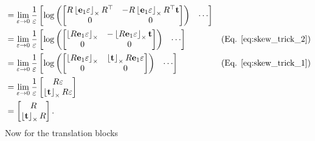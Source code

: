 \begin{align*}
 & =\lim_{\varepsilon\to0}\frac{1}{\varepsilon}\begin{bmatrix}\log\left(\begin{bmatrix}R\left\lfloor\mathbf{e}_{1}\varepsilon\right\rfloor_{\times}R^{\top} & -R\left\lfloor\mathbf{e}_{1}\varepsilon\right\rfloor_{\times}R^{\top}\mathbf{t}\\
0 & 0
\end{bmatrix}\right) & \cdots\end{bmatrix}\\
 & =\lim_{\varepsilon\to0}\frac{1}{\varepsilon}\begin{bmatrix}\log\left(\begin{bmatrix}\left\lfloor R\mathbf{e}_{1}\varepsilon\right\rfloor_{\times} & -\left\lfloor R\mathbf{e}_{1}\varepsilon\right\rfloor_{\times}\mathbf{t}\\
0 & 0
\end{bmatrix}\right) & \cdots\end{bmatrix} & \textnormal{(Eq. \ref{eq:skew_trick_2})}\\
 & =\lim_{\varepsilon\to0}\frac{1}{\varepsilon}\begin{bmatrix}\log\left(\begin{bmatrix}\left\lfloor R\mathbf{e}_{1}\varepsilon\right\rfloor_{\times} & \left\lfloor\mathbf{t}\right\rfloor_{\times}R\mathbf{e}_{1}\varepsilon\\
0 & 0
\end{bmatrix}\right) & \cdots\end{bmatrix} & \textnormal{(Eq. \ref{eq:skew_trick_1})}\\
 & =\lim_{\varepsilon\to0}\frac{1}{\varepsilon}\begin{bmatrix}R\varepsilon\\
\left\lfloor\mathbf{t}\right\rfloor_{\times}R\varepsilon
\end{bmatrix}\\
 & =\begin{bmatrix}R\\
\left\lfloor\mathbf{t}\right\rfloor_{\times}R
\end{bmatrix}.
\end{align*}
Now for the translation blocks

